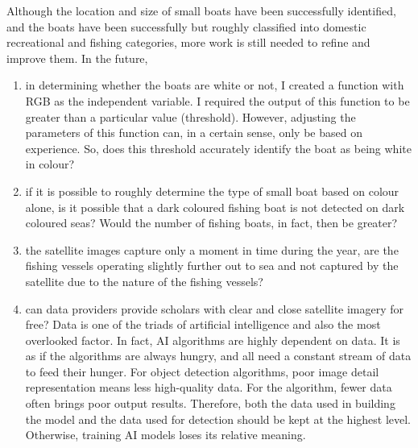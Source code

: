
Although the location and size of small boats have been successfully identified, and the boats have been successfully but roughly classified into domestic recreational and fishing categories, more work is still needed to refine and improve them. In the future,

\begin{enumerate}
    
    \item in determining whether the boats are white or not, I created a function with RGB as the independent variable. I required the output of this function to be greater than a particular value (threshold). However, adjusting the parameters of this function can, in a certain sense, only be based on experience. So, does this threshold accurately identify the boat as being white in colour?
    
    \item if it is possible to roughly determine the type of small boat based on colour alone, is it possible that a dark coloured fishing boat is not detected on dark coloured seas? Would the number of fishing boats, in fact, then be greater?
    
    \item the satellite images capture only a moment in time during the year, are the fishing vessels operating slightly further out to sea and not captured by the satellite due to the nature of the fishing vessels?


    \item can data providers provide scholars with clear and close satellite imagery for free? Data is one of the triads of artificial intelligence and also the most overlooked factor. In fact, AI algorithms are highly dependent on data. It is as if the algorithms are always hungry, and all need a constant stream of data to feed their hunger. For object detection algorithms, poor image detail representation means less high-quality data. For the algorithm, fewer data often brings poor output results. Therefore, both the data used in building the model and the data used for detection should be kept at the highest level. Otherwise, training AI models loses its relative meaning.
    

\end{enumerate}
